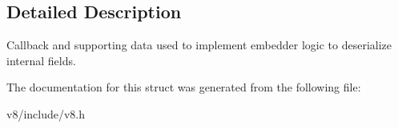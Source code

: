 \subsection{Detailed Description}
Callback and supporting data used to implement embedder logic to deserialize internal fields. 

The documentation for this struct was generated from the following file\+:\begin{DoxyCompactItemize}
\item 
v8/include/v8.\+h\end{DoxyCompactItemize}
